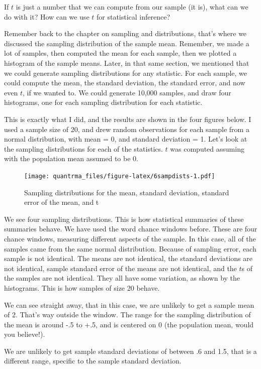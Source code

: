 \documentclass[
]{book}
\begin{document}
If \(t\) is just a number that we can compute from our sample (it is), what can we do with it? How can we use \(t\) for statistical inference?

Remember back to the chapter on sampling and distributions, that's where we discussed the sampling distribution of the sample mean. Remember, we made a lot of samples, then computed the mean for each sample, then we plotted a histogram of the sample means. Later, in that same section, we mentioned that we could generate sampling distributions for any statistic. For each sample, we could compute the mean, the standard deviation, the standard error, and now even \(t\), if we wanted to. We could generate 10,000 samples, and draw four histograms, one for each sampling distribution for each statistic.

This is exactly what I did, and the results are shown in the four figures below. I used a sample size of 20, and drew random observations for each sample from a normal distribution, with mean = 0, and standard deviation = 1. Let's look at the sampling distributions for each of the statistics. \(t\) was computed assuming with the population mean assumed to be 0.

\begin{figure}
\centering
\texttt{[image: quantrma\_files/figure-latex/6sampdists-1.pdf]}
\caption{\label{fig:6sampdists}Sampling distributions for the mean, standard deviation, standard error of the mean, and t}
\end{figure}

We see four sampling distributions. This is how statistical summaries of these summaries behave. We have used the word chance windows before. These are four chance windows, measuring different aspects of the sample. In this case, all of the samples came from the same normal distribution. Because of sampling error, each sample is not identical. The means are not identical, the standard deviations are not identical, sample standard error of the means are not identical, and the \(t\)s of the samples are not identical. They all have some variation, as shown by the histograms. This is how samples of size 20 behave.

We can see straight away, that in this case, we are unlikely to get a sample mean of 2. That's way outside the window. The range for the sampling distribution of the mean is around -.5 to +.5, and is centered on 0 (the population mean, would you believe!).

We are unlikely to get sample standard deviations of between .6 and 1.5, that is a different range, specific to the sample standard deviation.
\end{document}
